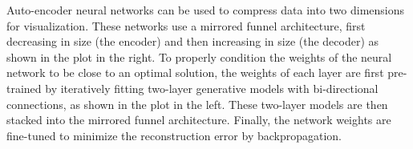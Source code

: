 Auto-encoder neural networks can be used to compress data into two dimensions for visualization. These networks use a mirrored funnel architecture, first decreasing in size (the encoder) and then increasing in size (the decoder) as shown in the plot in the right. To properly condition the weights of the neural network to be close to an optimal solution, the weights of each layer are first pre-trained by iteratively fitting two-layer generative models with bi-directional connections, as shown in the plot in the left. These two-layer models are then stacked into the mirrored funnel architecture. Finally, the network weights are fine-tuned to minimize the reconstruction error by backpropagation. \label{fig:stacked_rbms}

